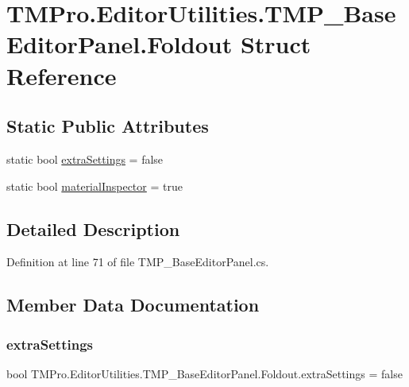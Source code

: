 \hypertarget{struct_t_m_pro_1_1_editor_utilities_1_1_t_m_p___base_editor_panel_1_1_foldout}{}\section{T\+M\+Pro.\+Editor\+Utilities.\+T\+M\+P\+\_\+\+Base\+Editor\+Panel.\+Foldout Struct Reference}
\label{struct_t_m_pro_1_1_editor_utilities_1_1_t_m_p___base_editor_panel_1_1_foldout}
\subsection*{Static Public Attributes}
\begin{DoxyCompactItemize}
\item 
static bool \mbox{\hyperlink{struct_t_m_pro_1_1_editor_utilities_1_1_t_m_p___base_editor_panel_1_1_foldout_aadab285b4225824d5dad2c72c9670a23}{extra\+Settings}} = false
\item 
static bool \mbox{\hyperlink{struct_t_m_pro_1_1_editor_utilities_1_1_t_m_p___base_editor_panel_1_1_foldout_adce2deb9f23313e580f181894a2c5ee6}{material\+Inspector}} = true
\end{DoxyCompactItemize}


\subsection{Detailed Description}


Definition at line 71 of file T\+M\+P\+\_\+\+Base\+Editor\+Panel.\+cs.



\subsection{Member Data Documentation}
\mbox{\label{struct_t_m_pro_1_1_editor_utilities_1_1_t_m_p___base_editor_panel_1_1_foldout_aadab285b4225824d5dad2c72c9670a23}} 
\subsubsection{\texorpdfstring{extraSettings}{extraSettings}}
{\footnotesize\ttfamily bool T\+M\+Pro.\+Editor\+Utilities.\+T\+M\+P\+\_\+\+Base\+Editor\+Panel.\+Foldout.\+extra\+Settings = false\hspace{0.3cm}{\ttfamily [static]}}



